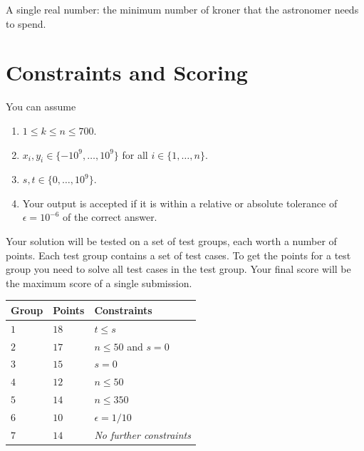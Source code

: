 A single real number: the minimum number of kroner that the astronomer needs to spend.

\section*{Constraints and Scoring}

You can assume 
\begin{enumerate}
\item $1\leq k\leq n\leq 700$. %
\item $x_i, y_i\in \{-10^9,\ldots, 10^9\}$ for all $i\in\{1,\ldots,n\}$. %
\item $s,t\in \{0,\ldots, 10^9\}$. %
\item Your output is accepted if it is within a relative or absolute tolerance of $\epsilon = 10^{-6}$ of the correct answer.
\end{enumerate}


Your solution will be tested on a set of test groups, each worth a number of points.
Each test group contains a set of test cases.
To get the points for a test group you need to solve all test cases in the test group.
Your final score will be the maximum score of a single submission.

\medskip
\noindent
\begin{tabular}{lll}
  Group & Points & Constraints\\\hline
  $1$ & $18$ &  $t\leq s$\\
  $2$ & $17$ & $n\le 50$ and $s=0$\\
  $3$ & $15$ & $s=0$\\
  $4$ & $12$ & $n\leq 50$\\
  $5$ & $14$ & $n\leq 350$\\
  $6$ & $10$ & $\epsilon = 1/10$\\
  $7$ & $14$ & \emph{No further constraints}\\
\end{tabular}
